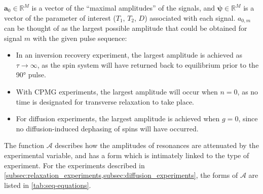 $\symbf{a}_0 \in \mathbb{R}^{M}$ is a vector of the ``maximal
amplitudes'' of the signals, and $\symbf{\psi} \in \mathbb{R}^M$ is a vector
of the parameter of interest ($T_1$,  $T_2$, $D$) associated with
each signal. $a_{0,m}$ can be thought of as the largest
possible amplitude that could be obtained for signal $m$ with the given
pulse sequence:
\begin{itemize}
    \item In an inversion recovery experiment, the largest amplitude is
        achieved as $\tau \rightarrow \infty$, as the spin system will have
        returned back to equilibrium prior to the \ang{90} pulse.
    \item With \ac{CPMG} experiments, the largest amplitude will occur when
        $n = 0$, as no time is designated for transverse
        relaxation to take place.
    \item For diffusion experiments, the largest amplitude is achieved when
        $g=0$, since no diffusion-induced dephasing of spins will have
        occurred.
\end{itemize}
The function $\mathcal{A}$ describes how the amplitudes of resonances are
attenuated by the experimental variable, and has a form which is intimately
linked to the type of experiment. For the experiments described in
\cref{subsec:relaxation_experiments,subsec:diffusion_experiments},
the forms of $\mathcal{A}$ are listed in \cref{tab:seq-equations}.
